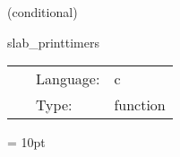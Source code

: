 \vspace{5mm}

   (conditional) 

\hspace{5mm} slab\_printtimers 

\hspace{5mm}{\it print timers } 


\hspace{5mm}

 \begin{tabular*}{160mm}{cll} 
~ & Language:  & c \\ 
~ & Type:  & function \\ 
\end{tabular*} 



\vspace{5mm}\parskip = 10pt 
